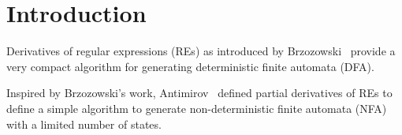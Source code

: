 \section{Introduction}\label{sec:intro}

Derivatives of regular expressions (REs) as introduced by Brzozowski~\cite{Brzozowski64,OwensEtAl09}
provide a very compact algorithm for generating deterministic finite automata (DFA).

Inspired by Brzozowski's work, Antimirov~\cite{Antimirov96} defined partial derivatives of REs to define a simple algorithm to generate non-deterministic finite automata (NFA) with a limited number of states.